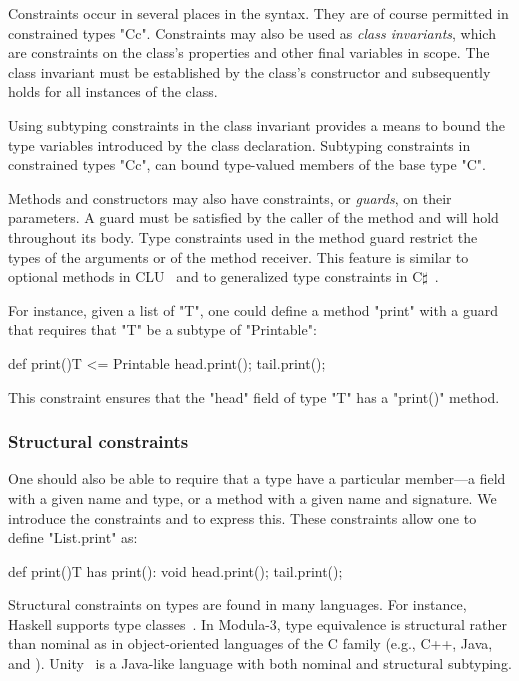 Constraints occur in several places in the \Xten syntax.  They
are of course permitted in constrained types \xcd"C{c}".
Constraints may also be used as \emph{class invariants}, 
which are constraints on the class's properties and other
final variables in scope.
The class invariant must be established by the class's
constructor and subsequently holds for all instances of the
class.

Using subtyping constraints in the class invariant provides a
means to bound the type variables introduced by the class
declaration.  Subtyping constraints in constrained types
\xcd"C{c}", can bound
type-valued members of the base type \xcd"C".

Methods and constructors
may also have constraints, or \emph{guards}, on their parameters.
A guard must be satisfied by the caller of the method and
will hold throughout its body.  Type constraints used in the
method guard restrict the types of the arguments or of the method
receiver.  
This feature is similar to optional methods in CLU~\cite{clu} and to generalized type constraints in C$\sharp$~\cite{emir06}.

For instance, given a list of \xcd"T", one could define a
method \xcd"print" with a guard that requires that \xcd"T" be a
subtype of \xcd"Printable":
\begin{xtenmathnoindent}
  def print(){T <= Printable} {
    head.print();
    tail.print();
  }
\end{xtenmathnoindent}
This constraint ensures that the \xcd"head" field of type
\xcd"T" has a \xcd"print()" method.

\subsubsection{Structural constraints}

One should also
be able to require that a type have a
particular member---a field with a given name and type, or a method
with a given name and signature.
We introduce the constraints 
   and  
 to express this.
These
constraints allow one to define \xcd"List.print" as:
\begin{xtenmathnoindent}
  def print(){T has print(): void} {
    head.print();
    tail.print();
  }
\end{xtenmathnoindent}

Structural constraints on types are found in many languages.
For instance,
Haskell supports type
classes~\cite{haskell,haskell-type-classes}.
%
In Modula-3, type equivalence is structural
rather than nominal as in object-oriented languages of the C
family (e.g., C++, Java, and \Xten{}).
Unity~\cite{malayeriIntegrating08}
is a Java-like language with both nominal and structural subtyping.

